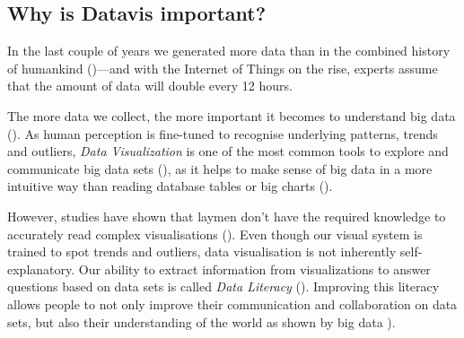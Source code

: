 
\subsection{Why is Datavis important?}


In the last couple of years we generated more data than in the combined history of humankind (\cite{helbing2019will})---and with the Internet of Things on the rise, experts assume that the amount of data will double every 12 hours.

The more data we collect, %
the more important it becomes to understand big data (\cite{borner_data_2019}). As human perception is fine-tuned to recognise underlying patterns, trends and outliers, \emph{Data Visualization} is one of the most common tools to explore and communicate big data sets (\cite{heer_tour_2010}), as it helps to make sense of big data in a more intuitive way than reading database tables or big charts (\cite{donalek_immersive_2014}).

However, studies have shown that laymen don't have the required knowledge to accurately read complex visualisations (\cite{borner_investigating_2016}). %
Even though our visual system is trained to spot trends and outliers, data visualisation is not inherently self-explanatory. Our ability to extract information from visualizations to answer questions based on data sets is called \emph{Data Literacy} (\cite{boy_principled_2014}). Improving this literacy allows people to not only improve their communication and collaboration on data sets, but also their understanding of the world as shown by big data \cite{borner_data_2019}). 
